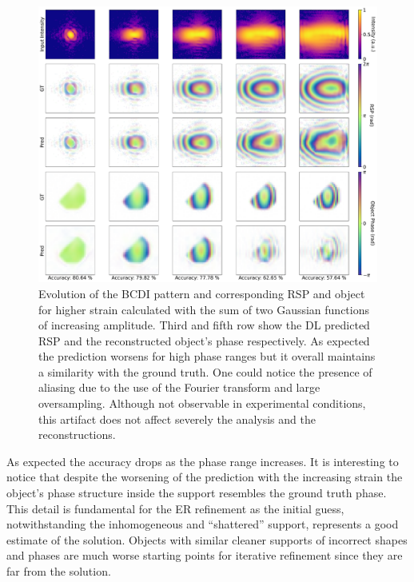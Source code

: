 \begin{figure}[H]
    \centering
    \includegraphics[width=\textwidth]{figures/Phasing/performance_gauss.pdf}
    \caption{Evolution of the BCDI pattern and corresponding RSP and object for higher strain calculated with the sum of 
    two Gaussian functions of increasing amplitude. Third and fifth row show the DL predicted RSP and the reconstructed 
    object's phase respectively. As expected the prediction worsens for high phase ranges but it overall maintains a similarity 
    with the ground truth. One could notice the presence of aliasing due to the use of the Fourier transform and large
    oversampling. Although not observable in experimental conditions, this artifact does not affect severely the analysis 
    and the reconstructions.}
    \label{fig:gauss}
\end{figure}

As expected the accuracy drops as the phase range increases.
It is interesting to notice that despite the worsening of the prediction with the increasing strain the object's phase 
structure inside the support resembles the ground truth phase. This detail is fundamental for the ER refinement as the 
initial guess, notwithstanding the inhomogeneous and ``shattered'' support, represents a good estimate of the solution. 
Objects with similar cleaner supports of incorrect shapes and phases are much worse starting points for iterative refinement 
since they are far from the solution. \\

